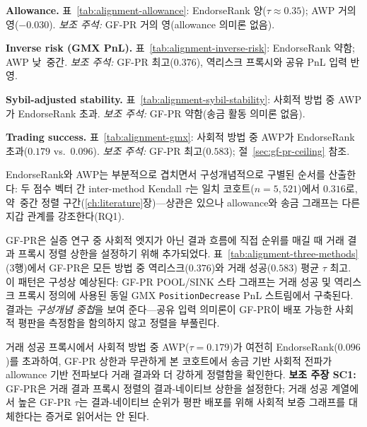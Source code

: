 

\textbf{Allowance.} 표~\ref{tab:alignment-allowance}: EndorseRank 양($\tau \approx 0.35$); AWP 거의 영($-0.030$). \emph{보조 주석:} GF-PR 거의 영(allowance 의미론 없음).



\textbf{Inverse risk (GMX PnL).} 표~\ref{tab:alignment-inverse-risk}: EndorseRank 약함; AWP 낮~중간. \emph{보조 주석:} GF-PR 최고($0.376$), 역리스크 프록시와 공유 PnL 입력 반영.



\textbf{Sybil-adjusted stability.} 표~\ref{tab:alignment-sybil-stability}: 사회적 방법 중 AWP가 EndorseRank 초과. \emph{보조 주석:} GF-PR 약함(송금 활동 의미론 없음).



\textbf{Trading success.} 표~\ref{tab:alignment-gmx}: 사회적 방법 중 AWP가 EndorseRank 초과($0.179$ vs.\ $0.096$). \emph{보조 주석:} GF-PR 최고($0.583$); 절~\ref{sec:gf-pr-ceiling} 참조.




EndorseRank와 AWP는 부분적으로 겹치면서 구성개념적으로 구별된 순서를 산출한다: 두 점수 벡터 간 inter-method Kendall $\tau$는 일치 코호트($n=5{,}521$)에서 $0.316$로, 약~중간 정렬 구간(\ref{ch:literature}장)---상관은 있으나 allowance와 송금 그래프는 다른 지갑 관계를 강조한다(RQ1).


GF-PR은 실증 연구 중 사회적 엣지가 아닌 결과 흐름에 직접 순위를 매길 때 거래 결과 프록시 정렬 상한을 설정하기 위해 추가되었다. 표~\ref{tab:alignment-three-methods}(3행)에서 GF-PR은 모든 방법 중 역리스크($0.376$)와 거래 성공($0.583$) 평균 $\tau$ 최고. 이 패턴은 구성상 예상된다: GF-PR POOL/SINK 스타 그래프는 거래 성공 및 역리스크 프록시 정의에 사용된 동일 GMX \texttt{PositionDecrease} PnL 스트림에서 구축된다. 결과는 \emph{구성개념 중첩}을 보여 준다---공유 입력 의미론이 GF-PR이 배포 가능한 사회적 평판을 측정함을 함의하지 않고 정렬을 부풀린다.

거래 성공 프록시에서 사회적 방법 중 AWP($\tau=0.179$)가 여전히 EndorseRank($0.096$)를 초과하여, GF-PR 상한과 무관하게 본 코호트에서 송금 기반 사회적 전파가 allowance 기반 전파보다 거래 결과와 더 강하게 정렬함을 확인한다. \textbf{보조 주장 SC1:} GF-PR은 거래 결과 프록시 정렬의 결과-네이티브 상한을 설정한다; 거래 성공 계열에서 높은 GF-PR $\tau$는 결과-네이티브 순위가 평판 배포를 위해 사회적 보증 그래프를 대체한다는 증거로 읽어서는 안 된다.

